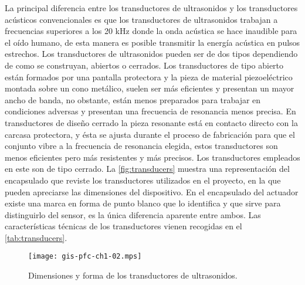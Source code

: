 La principal diferencia entre los transductores de ultrasonidos y los
transductores acústicos convencionales es que los transductores de
ultrasonidos trabajan a frecuencias superiores a los 20 kHz donde la onda
acústica se hace inaudible para el oído humano, de esta manera es posible
transmitir la energía acústica en pulsos estrechos. Los transductores de
ultrasonidos pueden ser de dos tipos dependiendo de como se construyan,
abiertos o cerrados. Los transductores de tipo abierto están formados por
una pantalla protectora y la pieza de material piezoeléctrico montada sobre
un cono metálico, suelen ser más eficientes y presentan un mayor ancho de
banda, no obstante, están menos preparados para trabajar en condiciones
adversas y presentan una frecuencia de resonancia menos precisa. En
transductores de diseño cerrado la pieza resonante está en contacto directo
con la carcasa protectora, y ésta se ajusta durante el proceso de
fabricación para que el conjunto vibre a la frecuencia de resonancia
elegida, estos transductores son menos eficientes pero más resistentes y
más precisos. Los transductores empleados en este  son de tipo
cerrado. La \vref{fig:transducers} muestra una representación del
encapsulado que reviste los transductores utilizados en el proyecto, en la
que pueden apreciarse las dimensiones del dispositivo. En el encapsulado
del actuador existe una marca en forma de punto blanco que lo identifica y
que sirve para distinguirlo del sensor, es la única diferencia aparente
entre ambos. Las características técnicas de los transductores vienen
recogidas en el \cref{tab:transducers}.

\begin{figure}
	\begin{center}
		\texttt{[image: gis-pfc-ch1-02.mps]}
	\end{center}
	\caption[Dimensiones de los transductores de
	ultrasonidos]{Dimensiones y forma de los transductores de
	ultrasonidos.}
	\label{fig:transducers}
\end{figure}

